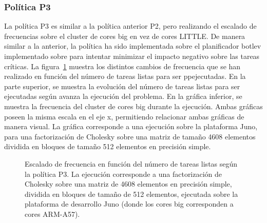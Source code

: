 \subsubsection{Política P3}
La política P3 es similar a la política anterior P2, pero realizando el
escalado de frecuencias sobre el cluster de cores big en vez de cores
LITTLE. De manera similar a la anterior, la política ha sido implementada
sobre el planificador botlev implementado sobre \ompss para intentar
minimizar el impacto negativo sobre las tareas críticas. La
figura~\ref{s5:fig:P3-evo} muestra los distintos cambios de frecuencia que
se han realizado en función del número de tareas listas para ser
ppejecutadas. En la parte superior, se muestra la evolución del número de
tareas listas para ser ejecutadas según avanza la ejecución del
problema. En la gráfica inferior, se muestra la frecuencia del cluster de
cores big durante la ejecución. Ambas gráficas poseen la misma escala en el
eje x, permitiendo relacionar ambas gráficas de manera visual. La gráfica
corresponde a una ejecución sobre la plataforma Juno, para una
factorización de Cholesky sobre una matriz de tamaño 4608 elementos
dividida en bloques de tamaño 512 elementos en precisión simple.\\


\begin{figure}
  \centering
  {
    \setlength{\fboxsep}{-10pt}
  }
  \caption[Escalado de frecuencia en función del número de tareas listas
  según la política P3]{Escalado de frecuencia en función del número de
    tareas listas según la política P3. La ejecución corresponde a una
    factorización de Cholesky sobre una matriz de 4608 elementos en
    precisión simple, dividida en bloques de tamaño de 512 elementos,
    ejecutada sobre la plataforma de desarrollo Juno (donde los cores big
    corresponden a cores ARM-A57).}
  \label{s5:fig:P3-evo}
\end{figure}


